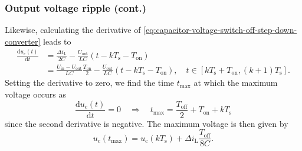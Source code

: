 \begin{frame}
    \frametitle{Output voltage ripple (cont.)}
    Likewise, calculating the derivative of \eqref{eq:capacitor-voltage-switch-off-step-down-converter} leads to
    \begin{equation}
        \begin{split}
            \frac{\mathrm{d}u_\mathrm{c}(t)}{\mathrm{d}t} &= \frac{\Delta i_\mathrm{L}}{2 C} - \frac{U_\mathrm{out}}{LC} (t-kT_\mathrm{s} - T_\mathrm{on})\\
                                                          &= \frac{U_\mathrm{in}-U_\mathrm{out}}{LC}\frac{T_\mathrm{on}}{2} -\frac{U_\mathrm{out}}{LC} (t-kT_\mathrm{s} - T_\mathrm{on}), \quad t\in [k T_\mathrm{s} + T_\mathrm{on}, (k+1) T_\mathrm{s}].
        \end{split}
    \end{equation}
    Setting the derivative to zero, we find the time $t_\mathrm{max}$ at which the maximum voltage occurs as
    \begin{equation}
        \frac{\mathrm{d}u_\mathrm{c}(t)}{\mathrm{d}t} = 0 \quad \Rightarrow \quad t_\mathrm{max} = \frac{T_\mathrm{off}}{2} + T_\mathrm{on} + k T_\mathrm{s}
    \end{equation}
    since the second derivative is negative. The maximum voltage is then given by
    \begin{equation}
        u_\mathrm{c}(t_\mathrm{max}) = u_\mathrm{c}(kT_\mathrm{s}) + \Delta i_\mathrm{L}\frac{T_\mathrm{off}}{8C}.
    \end{equation}
\end{frame}

